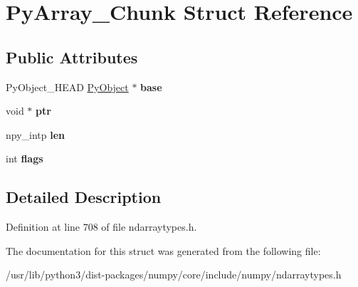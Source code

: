 \hypertarget{structPyArray__Chunk}{}\section{Py\+Array\+\_\+\+Chunk Struct Reference}
\label{structPyArray__Chunk}
\subsection*{Public Attributes}
\begin{DoxyCompactItemize}
\item 
Py\+Object\+\_\+\+H\+E\+AD \hyperlink{struct__object}{Py\+Object} $\ast$ {\bfseries base}\hypertarget{structPyArray__Chunk_ae4406fd302f3be6b0703683829cf5a04}{}\label{structPyArray__Chunk_ae4406fd302f3be6b0703683829cf5a04}

\item 
void $\ast$ {\bfseries ptr}\hypertarget{structPyArray__Chunk_a1259c1589f1d65634a3880acc557a14e}{}\label{structPyArray__Chunk_a1259c1589f1d65634a3880acc557a14e}

\item 
npy\+\_\+intp {\bfseries len}\hypertarget{structPyArray__Chunk_abb6db82c88df0ddfcdbd2d947833e7ec}{}\label{structPyArray__Chunk_abb6db82c88df0ddfcdbd2d947833e7ec}

\item 
int {\bfseries flags}\hypertarget{structPyArray__Chunk_a4dac1d595913af0e2193bf1e93e960cb}{}\label{structPyArray__Chunk_a4dac1d595913af0e2193bf1e93e960cb}

\end{DoxyCompactItemize}


\subsection{Detailed Description}


Definition at line 708 of file ndarraytypes.\+h.



The documentation for this struct was generated from the following file\+:\begin{DoxyCompactItemize}
\item 
/usr/lib/python3/dist-\/packages/numpy/core/include/numpy/ndarraytypes.\+h\end{DoxyCompactItemize}
